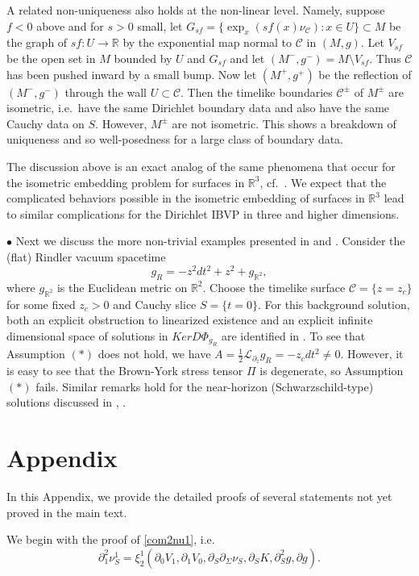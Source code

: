 \documentclass[10pt]{amsart}
\newcommand{\Si}{\Sigma}
\newcommand{\cC}{{\mathcal C}}
\newcommand{\cL}{{\mathcal L}}
\newcommand{\bR}{\mathbb R}
\newcommand{\p}{\partial}
\renewcommand{\to}{\rightarrow}
\renewcommand{\exp}{\operatorname{exp}}
\newcommand{\<}{\langle}
\renewcommand{\>}{\rangle}
\theoremstyle{plain}
\theoremstyle{remark}
\theoremstyle{definition}
\numberwithin{equation}{section}
\begin{document}
  A related non-uniqueness also holds at the non-linear level. Namely, suppose $f < 0$ above and for $s > 0$ small, let $G_{sf} = \{\exp_x (sf(x)\nu_{\cC}): x \in U\} \subset M$ 
 be the graph of $sf: U \to \bR$ by the exponential map normal to $\cC$ in $(M, g)$. Let $V_{sf}$ be the open set in $M$ bounded by $U$ and $G_{sf}$ and let $(M^-,g^-) = 
 M \setminus V_{sf}$. Thus $\cC$ has been pushed inward by a small bump. Now let $(M^+, g^+)$ be the reflection of $(M^-, g^-)$ through the wall 
 $U \subset \cC$. Then the timelike boundaries $\cC^{\pm}$ of $M^{\pm}$ are isometric, i.e.~have the same Dirichlet boundary data and also have the same 
 Cauchy data on $S$. However, $M^{\pm}$ are not isometric. This shows a breakdown of uniqueness and so well-posedness for a large class of boundary data. 
 
    The discussion above is an exact analog of the same phenomena that occur for the isometric embedding problem for surfaces in $\bR^3$, cf.~\cite{Sp}. 
We expect that the complicated behaviors possible in the isometric embedding of surfaces in $\bR^3$ lead to similar complications for the 
Dirichlet IBVP in three and higher dimensions. 

\smallskip 
 
$\bullet$ Next we discuss the more non-trivial examples presented in \cite{BS} and \cite{AGAM}. Consider the (flat) Rindler vacuum spacetime
$$g_R = -z^2 dt^2 + z^2 + g_{\bR^2},$$
where $g_{\bR^2}$ is the Euclidean metric on $\bR^2$. Choose the timelike surface $\cC = \{z = z_c\}$ for some fixed $z_c > 0$ and Cauchy slice 
$S = \{t = 0\}$. For this background solution, both an explicit obstruction to linearized existence and an explicit infinite dimensional space of 
solutions in $Ker D\Phi_{g_R}$ are identified in \cite{AGAM}. To see that Assumption $(*)$ does not hold, we have $A = 
\frac{1}{2}\cL_{\p_z}g_R = -z_c dt^2 \neq 0$. However, it is easy to see that the Brown-York stress tensor $\Pi$ is degenerate, so Assumption $(*)$ fails. 
Similar remarks hold for the near-horizon (Schwarzschild-type) solutions discussed in \cite{BS}, \cite{AGAM}. 


\section{Appendix} 

  In this Appendix, we provide the detailed proofs of several statements not yet proved in the main text. 
  
    We begin with the proof of \eqref{com2nu1}, i.e.
$$\p_1^2\nu_S^1=\xi_2^1(\p_0 V_1,\p_1 V_0,\p_S\p_\Si \nu_S, \p_S K, \p_S^2 g, \p g).$$
\end{document}
